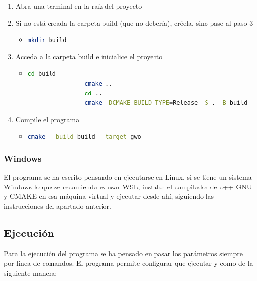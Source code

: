 \documentclass[a4paper, 12.5pt]{report}
\begin{document}
\begin{enumerate}
    \item Abra una terminal en la raíz del proyecto
    \item Si no está creada la carpeta build (que no debería), créela, sino pase al paso 3
          \begin{itemize}
              \item \begin{lstlisting}[language=bash]
				mkdir build
            \end{lstlisting}
          \end{itemize}
    \item Acceda a la carpeta build e inicialice el proyecto
          \begin{itemize}
              \item \begin{lstlisting}[language=bash]
				cd build
				cmake ..
				cd ..
				cmake -DCMAKE_BUILD_TYPE=Release -S . -B build
            \end{lstlisting}
          \end{itemize}
    \item Compile el programa
          \begin{itemize}
              \item \begin{lstlisting}[language=bash]
				cmake --build build --target gwo
            \end{lstlisting}
          \end{itemize}
\end{enumerate}

\subsubsection{Windows}

El programa se ha escrito pensando en ejecutarse en Linux, si se tiene un sistema Windows lo que se recomienda es usar WSL, instalar el compilador de c++ GNU y CMAKE en esa máquina virtual y ejecutar desde ahí, siguiendo las instrucciones del apartado anterior.

\subsection{Ejecución}

Para la ejecución del programa se ha pensado en pasar los parámetros siempre por línea de comandos. El programa permite configurar que ejecutar y como de la siguiente manera:
\end{document}
